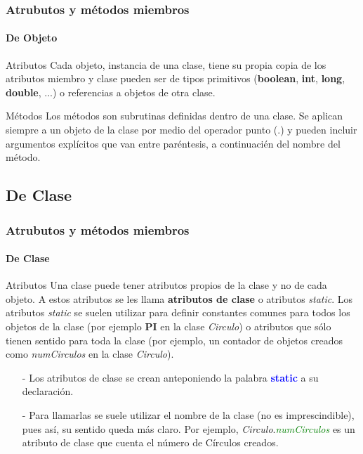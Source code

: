 \documentclass{beamer}
\begin{document}
        \begin{frame}
			\frametitle{Atrubutos y m\'etodos miembros}
			\framesubtitle{De Objeto}

			\begin{block}{Atributos}
			    {\scriptsize
                    Cada objeto, instancia de una clase, tiene su propia copia de los atributos miembro y clase pueden ser de tipos primitivos (\textbf{boolean}, \textbf{int}, \textbf{long}, \textbf{double}, ...) o referencias a objetos de otra clase.
			    }
			\end{block}

			\begin{block}{M\'etodos}
			    {\scriptsize
                    Los m\'etodos son subrutinas definidas dentro de una clase. Se aplican siempre a un objeto de la clase por medio del operador punto (.) y pueden incluir argumentos expl\'icitos que van entre par\'entesis, a continuaci\'en del nombre del m\'etodo.
			    }
			\end{block}	
		\end{frame}
		
        \subsection{De Clase}

        \begin{frame}
			\frametitle{Atrubutos y m\'etodos miembros}
			\framesubtitle{De Clase}

			\begin{block}{Atributos}
			    {\scriptsize
                    Una clase puede tener atributos propios de la clase y no de cada objeto. A estos atributos se les llama \textbf{atributos de clase} o atributos \emph{static}. Los atributos \emph{static} se suelen utilizar para definir constantes comunes para todos los objetos de la clase (por ejemplo \textbf{PI} en la clase \emph{Circulo}) o atributos que s\'olo tienen sentido para toda la clase (por ejemplo, un contador de objetos creados como \emph{numCirculos} en la clase \emph{Circulo}).
			    }
			\end{block}

			\begin{block}{}
			    {\scriptsize
			        \begin{itemize}
			            \item[-] Los atributos de clase se crean anteponiendo la palabra \textcolor{blue}{\textbf{static}} a su declaraci\'on. 
                        \item[-] Para llamarlas se suele utilizar el nombre de la clase (no es imprescindible), pues as\'i, su sentido queda m\'as claro. Por ejemplo, \emph{Circulo}.\textcolor{green}{\emph{numCirculos}} es un atributo de clase que cuenta el n\'umero de C\'irculos creados.
			        \end{itemize}
			    }
			\end{block}
			
		\end{frame}		
		
\end{document}
